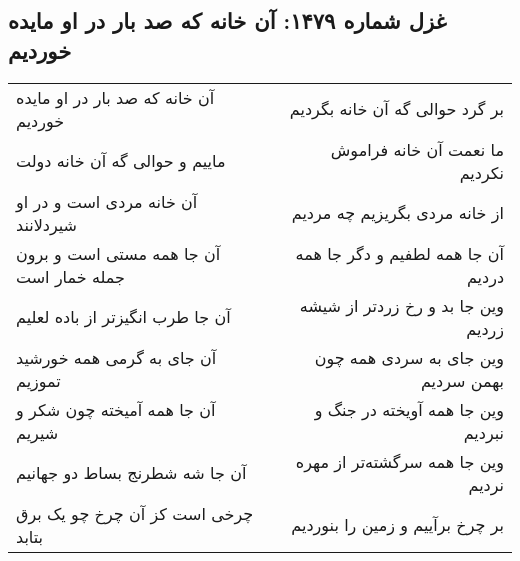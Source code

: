 \begin{center}
\section*{غزل شماره ۱۴۷۹: آن خانه که صد بار در او مایده خوردیم}
\label{sec:1479}
\begin{longtable}{l p{0.5cm} r}
آن خانه که صد بار در او مایده خوردیم
&&
بر گرد حوالی گه آن خانه بگردیم
\\
ماییم و حوالی گه آن خانه دولت
&&
ما نعمت آن خانه فراموش نکردیم
\\
آن خانه مردی است و در او شیردلانند
&&
از خانه مردی بگریزیم چه مردیم
\\
آن جا همه مستی است و برون جمله خمار است
&&
آن جا همه لطفیم و دگر جا همه دردیم
\\
آن جا طرب انگیزتر از باده لعلیم
&&
وین جا بد و رخ زردتر از شیشه زردیم
\\
آن جای به گرمی همه خورشید تموزیم
&&
وین جای به سردی همه چون بهمن سردیم
\\
آن جا همه آمیخته چون شکر و شیریم
&&
وین جا همه آویخته در جنگ و نبردیم
\\
آن جا شه شطرنج بساط دو جهانیم
&&
وین جا همه سرگشته‌تر از مهره نردیم
\\
چرخی است کز آن چرخ چو یک برق بتابد
&&
بر چرخ برآییم و زمین را بنوردیم
\\
\end{longtable}
\end{center}
